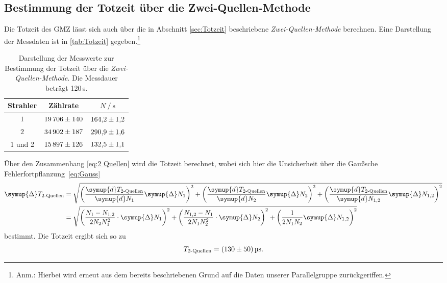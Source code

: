 \subsection{Bestimmung der Totzeit über die Zwei-Quellen-Methode}
Die Totzeit des GMZ lässt sich auch über die in Abschnitt \ref{sec:Totzeit} beschriebene \textit{Zwei-Quellen-Methode} berechnen. Eine Darstellung
der Messdaten ist in \autoref{tab:Totzeit} gegeben.\footnote{Anm.: Hierbei wird erneut aus dem bereits beschriebenen Grund auf die Daten 
unserer Parallelgruppe zurückgeriffen.}
\begin{table}[H]
    \centering
    \caption{Darstellung der Messwerte zur Bestimmung der Totzeit über die \textit{Zwei-Quellen-Methode}. Die Messdauer beträgt 120\,s.}
    \label{tab:Totzeit}
    \begin{tabular}{c S S}
      \toprule
      {Strahler} & {Zählrate} & {$N \mathbin{/} {\unit{\second}}$}\\
      \midrule
      $1$   & $\num{19706+-140}$ & $\num{164.2+-1.2}$ \\
      $2$   & $\num{34902+-187}$ & $\num{290.9+-1.6}$ \\
      {1 und 2} & $\num{15897+-126}$ & $\num{132.5+-1.1}$ \\
      \bottomrule
    \end{tabular}
  \end{table}
Über den Zusammenhang \eqref{eq:2 Quellen} wird die Totzeit berechnet, wobei sich hier die Unsicherheit über die Gaußsche 
Fehlerfortpflanzung~\eqref{eq:Gauss}
\begin{align*}
    \symup{\Delta}T_{\text{2-Quellen}} 
    &= \sqrt{\left(\frac{\symup{d}T_{\text{2-Quellen}}}{\symup{d}N_1}\symup{\Delta} N_1 \right)^2 
    + \left(\frac{\symup{d}T_{\text{2-Quellen}}}{\symup{d}N_2}\symup{\Delta} N_2 \right)^2
    + \left(\frac{\symup{d}T_{\text{2-Quellen}}}{\symup{d}N_{1,2}}\symup{\Delta} N_{1,2} \right)^2} \\
    &= \sqrt{\left(\frac{N_1 - N_{1,2}}{2N_2 N_1^2} \cdot \symup{\Delta}N_1 \right)^2 
    + \left(\frac{N_{1,2} - N_{1}}{2N_1 N_2^2} \cdot \symup{\Delta}N_2 \right)^2
    + \left( \frac{1}{2N_1 N_2}\symup{\Delta}N_{1,2}\right)^2}
\end{align*}
bestimmt.
Die Totzeit ergibt sich so zu
\begin{equation*}
    T_{\text{2-Quellen}} = \qty{130+-50}{\micro\second}.
\end{equation*}

